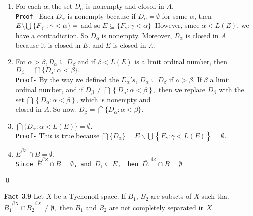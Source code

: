 \documentclass{article}
\begin{document}
			      \begin{enumerate}
			      \item For each $  \alpha  $, the set $ D_\alpha  $ is nonempty and closed in $A$.\\
				  \texttt{Proof-} Each $D_\alpha$ is nonempty because if $D_\alpha=\emptyset$ for some $\alpha$, then $E\backslash \bigcup \left\{F_\gamma: \gamma<\alpha\right\}=\empty$ and so $E \subseteq \{F_\gamma: \gamma<\alpha\}$. However, since $\alpha<L(E)$, we have a contradiction. So $D_\alpha$ is nonempty. Moreover, $D_\alpha$ is closed in $A$ because it is closed in $E$, and $E$ is closed in $A$.
				  \vskip 10pt
				  \item For $ \alpha>\beta, D_\alpha \subseteq D_\beta  $ and if $  \beta <L(E) $ is a limit ordinal number, then\\$  D_\beta=\bigcap \{D_\alpha:\alpha <\beta\}.$\\
																			      \texttt{Proof-} By the way we defined the ${D_\alpha}'s$, $D_\alpha\subseteq D_\beta$ if $\alpha>\beta$. If $\beta$ a limit ordinal number, and 
																			      if $D_\beta \neq \bigcap\left\{D_\alpha:\alpha<\beta\right\}, $ then we replace $D_\beta$ with the set $\bigcap\left\{D_\alpha:\alpha<\beta\right\}$, which is nonempty and\\ closed in $A$. So now, $ D_\beta=\bigcap \{D_\alpha:\alpha <\beta\}.$
																			      \vskip 10pt
																			      \item $ \bigcap\{D_\alpha: \alpha< L(E)\}=\emptyset . $\\
																				  \texttt{Proof-} This is true because $ \bigcap\{D_\alpha\}= E\backslash\bigcup\left\{F_\gamma: \gamma<L(E)\right\}=\emptyset.$

																				  \vskip 10pt
																				  \item $\overline{E}^{\beta Z} \cap B =\emptyset.$\\
																				      \texttt{Since $\overline{E}^{\beta Z} \cap B=\emptyset$, and $D_1\subseteq E$, then $\overline{D_1}^{\beta Z}\cap B=\emptyset.$}	 
																				      \end{enumerate} \qed



																				      \vskip 30pt



																				      \textbf{Fact 3.9} Let $X$ be a Tychonoff space. If $B_1$, $B_2$ are subsets of $X$ such that $\overline{B_1}^{\beta X} \cap \overline{B_2}^{\beta X} \neq \emptyset,$ then $B_1$ and $B_2$ are not completely separated in $X$. 
\end{document}

